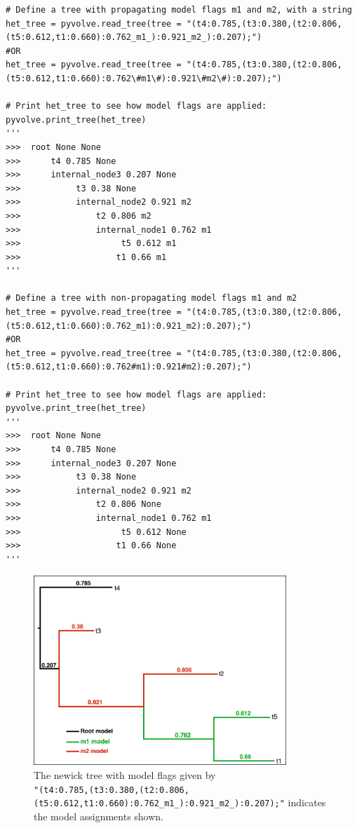 \documentclass{article}
\begin{document}
\begin{lstlisting}
# Define a tree with propagating model flags m1 and m2, with a string
het_tree = pyvolve.read_tree(tree = "(t4:0.785,(t3:0.380,(t2:0.806,(t5:0.612,t1:0.660):0.762_m1_):0.921_m2_):0.207);")
#OR 
het_tree = pyvolve.read_tree(tree = "(t4:0.785,(t3:0.380,(t2:0.806,(t5:0.612,t1:0.660):0.762\#m1\#):0.921\#m2\#):0.207);")

# Print het_tree to see how model flags are applied:
pyvolve.print_tree(het_tree)
'''
>>>  root None None
>>>      t4 0.785 None
>>>      internal_node3 0.207 None
>>>           t3 0.38 None
>>>           internal_node2 0.921 m2
>>>               t2 0.806 m2
>>>               internal_node1 0.762 m1
>>>                    t5 0.612 m1
>>>                   t1 0.66 m1 
'''

# Define a tree with non-propagating model flags m1 and m2
het_tree = pyvolve.read_tree(tree = "(t4:0.785,(t3:0.380,(t2:0.806,(t5:0.612,t1:0.660):0.762_m1):0.921_m2):0.207);")
#OR 
het_tree = pyvolve.read_tree(tree = "(t4:0.785,(t3:0.380,(t2:0.806,(t5:0.612,t1:0.660):0.762#m1):0.921#m2):0.207);")

# Print het_tree to see how model flags are applied:
pyvolve.print_tree(het_tree)
'''
>>>  root None None
>>>      t4 0.785 None
>>>      internal_node3 0.207 None
>>>           t3 0.38 None
>>>           internal_node2 0.921 m2
>>>               t2 0.806 None
>>>               internal_node1 0.762 m1
>>>                    t5 0.612 None
>>>                   t1 0.66 None
'''
\end{lstlisting}


\begin{figure}[htpb]%
	\includegraphics[width=3.75in]{treeflags_colors.pdf}
	\caption{\label{fig:treeflags} The newick tree with model flags given by \\ \texttt{\scriptsize{"(t4:0.785,(t3:0.380,(t2:0.806,(t5:0.612,t1:0.660):0.762\_m1\_):0.921\_m2\_):0.207);"}}
		indicates the model assignments shown.}
\end{figure}
\end{document}
